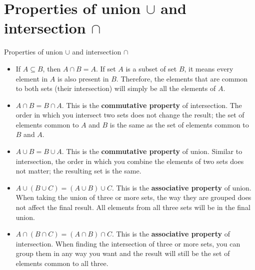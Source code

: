 \documentclass[11pt,aspectratio=1610]{beamer}
\begin{document}
\section*{Properties of union $\cup$ and intersection $\cap$}			
\begin{frame}{Properties of union $\cup$ and intersection $\cap$}	
	\small
	\begin{itemize}%
		\item If $A \subseteq B$, then $A \cap B = A$.
		\vspace{0.2cm}
		If set $A$ is a subset of set $B$, it means every element in $A$ is also present in $B$. Therefore, the elements that are common to both sets (their intersection) will simply be all the elements of $A$.
		
		\item $A \cap B = B \cap A$.
		\vspace{0.2cm}
		This is the \textbf{commutative property} of intersection. The order in which you intersect two sets does not change the result; the set of elements common to $A$ and $B$ is the same as the set of elements common to $B$ and $A$.
		
		\item $A \cup B = B \cup A$.
		\vspace{0.2cm}
		This is the \textbf{commutative property} of union. Similar to intersection, the order in which you combine the elements of two sets does not matter; the resulting set is the same.
		
		\item $A \cup (B \cup C) = (A \cup B) \cup C$.
		\vspace{0.2cm}
		This is the \textbf{associative property} of union. When taking the union of three or more sets, the way they are grouped does not affect the final result. All elements from all three sets will be in the final union.
		
		\item $A \cap (B \cap C) = (A \cap B) \cap C$.
		\vspace{0.2cm}
		This is the \textbf{associative property} of intersection. When finding the intersection of three or more sets, you can group them in any way you want and the result will still be the set of elements common to all three.
	\end{itemize}
\end{frame}


\end{document}

